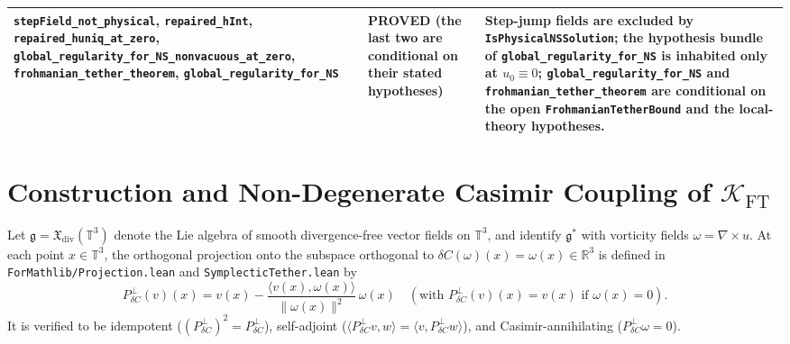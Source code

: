 \documentclass[11pt,a4paper]{article}
\theoremstyle{definition}
\begin{document}
\begin{table}[htbp]
\begin{tabular}{p{}p{}p{}}
\addlinespace
\texttt{stepField\_not\_physical}, \texttt{repaired\_hInt}, \texttt{repaired\_huniq\_at\_zero}, \texttt{global\_regularity\_for\_NS\_nonvacuous\_at\_zero}, \texttt{frohmanian\_tether\_theorem}, \texttt{global\_regularity\_for\_NS} & \textbf{PROVED} (the last two are \textbf{conditional} on their stated hypotheses) & Step-jump fields are excluded by \texttt{IsPhysicalNSSolution}; the hypothesis bundle of \texttt{global\_regularity\_for\_NS} is inhabited only at $u_0 \equiv 0$; \texttt{global\_regularity\_for\_NS} and \texttt{frohmanian\_tether\_theorem} are conditional on the open \texttt{FrohmanianTetherBound} and the local-theory hypotheses. \\
\bottomrule
\end{tabular}
\end{table}

\section{Construction and Non-Degenerate Casimir Coupling of $\mathcal{K}_{\mathrm{FT}}$}

Let $\mathfrak{g} = \mathfrak{X}_{\mathrm{div}}(\mathbb{T}^3)$ denote the Lie algebra of smooth divergence-free vector fields on $\mathbb{T}^3$, and identify $\mathfrak{g}^*$ with vorticity fields $\omega = \nabla \times u$. At each point $x \in \mathbb{T}^3$, the orthogonal projection onto the subspace orthogonal to $\delta C(\omega)(x) = \omega(x) \in \mathbb{R}^3$ is defined in \texttt{ForMathlib/Projection.lean} and \texttt{SymplecticTether.lean} by
\begin{equation}
  P_{\delta C}^\perp(v)(x) = v(x) - \frac{\langle v(x), \omega(x) \rangle}{\|\omega(x)\|^2}\,\omega(x) \quad (\text{with } P_{\delta C}^\perp(v)(x) = v(x) \text{ if } \omega(x) = 0).
  \label{eq:proj-casimir}
\end{equation}
It is verified to be idempotent ($(P_{\delta C}^\perp)^2 = P_{\delta C}^\perp$), self-adjoint ($\langle P_{\delta C}^\perp v, w \rangle = \langle v, P_{\delta C}^\perp w \rangle$), and Casimir-annihilating ($P_{\delta C}^\perp \omega = 0$).
\end{document}

